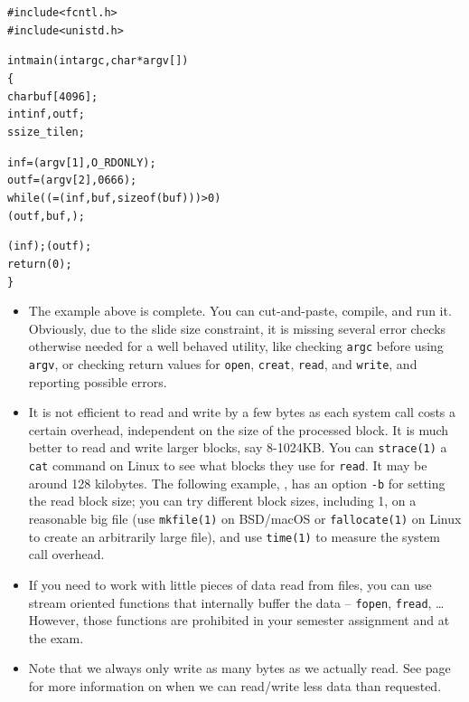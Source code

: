 
\begin{slide}
\begin{alltt}
{\footnotesize
#include <fcntl.h>
#include <unistd.h>

int main(int argc, char *argv[])
\{
    char buf[4096];
    int inf, outf;
    ssize\_t ilen;

    inf = (argv[1], O\_RDONLY);
    outf = (argv[2], 0666);
    while (( = (inf, buf, sizeof (buf))) > 0)
            (outf, buf, );

    (inf); (outf);
    return (0);
\}
}
\end{alltt}
\end{slide}

\begin{itemize}
\item The example above is complete.  You can cut-and-paste, compile, and run
it.  Obviously, due to the slide size constraint, it is missing several error
checks otherwise needed for a well behaved utility, like checking \texttt{argc}
before using \texttt{argv}, or checking return values for \texttt{open},
\texttt{creat}, \texttt{read}, and \texttt{write}, and reporting possible
errors.
\item It is not efficient to read and write by a few bytes as each system call
costs a certain overhead, independent on the size of the processed block.  It is
much better to read and write larger blocks, say 8-1024KB.  You can
\texttt{strace(1)} a \texttt{cat} command on Linux to see what blocks they use
for \texttt{read}.  It may be around 128 kilobytes.  The following example,
, has an option \texttt{-b} for setting the read block size;
you can try different block sizes, including 1, on a reasonable big file (use
\texttt{mkfile(1)} on BSD/macOS or \texttt{fallocate(1)} on Linux to create an
arbitrarily large file), and use \texttt{time(1)} to measure the system call
overhead.
\item If you need to work with little pieces of data read from files, you can
use stream oriented functions that internally buffer the data -- \texttt{fopen},
\texttt{fread}, \dots  However, those functions are prohibited in your semester
assignment and at the exam.
\item Note that we always only write as many bytes as we actually read.  See
page \pageref{READCALL} for more information on when we can read/write less data
than requested.
\end{itemize}

